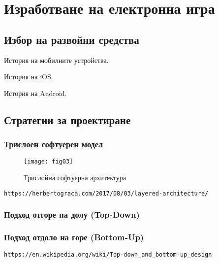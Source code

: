 ﻿\newpage
\chapter{Изработване на електронна игра}
\label{chapter02}

\section{Избор на развойни средства}

История на мобилните устройства.

История на iOS.

История на Android.

\section{Стратегии за проектиране}

\subsection{Трислоен софтуерен модел}

\begin{figure}[h!]
 \centering
 \texttt{[image: fig03]}
 \caption{Трислойна софтуерна архитектура}
\label{figure03}
\end{figure}
\FloatBarrier

\begin{lstlisting}
https://herbertograca.com/2017/08/03/layered-architecture/
\end{lstlisting}

\subsection{Подход отгоре на долу (Top-Down)}

\subsection{Подход отдоло на горе (Bottom-Up)}

\begin{lstlisting}
https://en.wikipedia.org/wiki/Top-down_and_bottom-up_design
\end{lstlisting}

